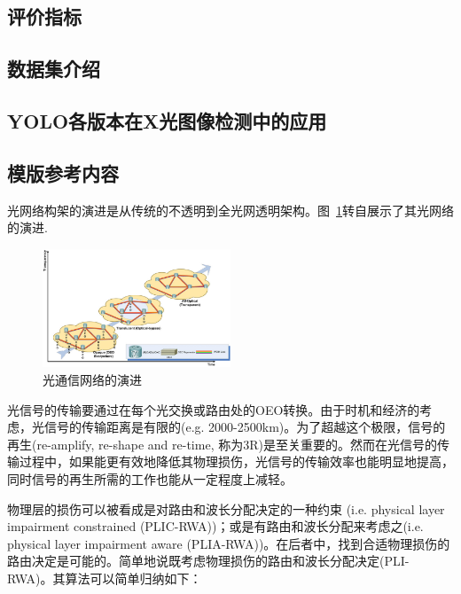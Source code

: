 \documentclass[11pt,twocolumn]{ctexart}
\begin{document}
\subsection{评价指标}
\subsection{数据集介绍}
\subsection{YOLO各版本在X光图像检测中的应用}

\subsection{模版参考内容}
光网络构架的演进是从传统的不透明到全光网透明架构。图~\ref{EVO}转自\cite{1}展示了其光网络的演进.
\begin{figure}[!hbtp]
  \begin{center}
  \includegraphics[width=0.5\textwidth]{EVO}
  \end{center}
  \caption{光通信网络的演进}
  \label{EVO}
\end{figure}

光信号的传输要通过在每个光交换或路由处的OEO转换。由于时机和经济的考虑，光信号的传输距离是有限的(e.g. 2000-2500km)。为了超越这个极限，信号的再生(re-amplify, re-shape and re-time, 称为3R)是至关重要的。然而在光信号的传输过程中，如果能更有效地降低其物理损伤，光信号的传输效率也能明显地提高，同时信号的再生所需的工作也能从一定程度上减轻。

物理层的损伤可以被看成是对路由和波长分配决定的一种约束 (i.e. physical layer impairment constrained (PLIC-RWA))；或是有路由和波长分配来考虑之(i.e. physical layer impairment aware (PLIA-RWA))。在后者中，找到合适物理损伤的路由决定是可能的。简单地说既考虑物理损伤的路由和波长分配决定(PLI-RWA)。其算法可以简单归纳如下：
\end{document}
